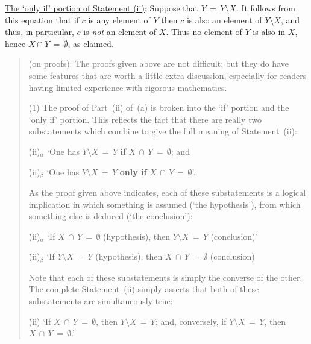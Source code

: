         \underline{The `only if' portion of Statement (ii)}: Suppose that $Y \,=\, Y{\setminus}X$.
    It follows from this equation that if $c$ is any element of $Y$ then $c$ is also an element of $Y{\setminus}X$, and thus, in particular, $c$ is {\em not} an element of $X$.
    Thus no element of $Y$ is also in $X$, hence $X{\cap}Y \,=\, {\emptyset}$, as claimed.

\V


\begin{quotation}
{\footnotesize \underline{\Note} (on proofs): The proofs given above are not difficult;
    but they do have some features that are worth a little extra discussion, especially for readers having limited experience with rigorous mathematics.

\V

        (1) The proof of Part~(ii) of~(a) is broken into the `if' portion and the `only if' portion.
	This reflects the fact that there are really two substatements which combine to give the full meaning of Statement~(ii):

    \h (ii)$_{{\alpha}}$ `One has $Y{\setminus}X \,=\, Y$ {\bf if} $X\,{\cap}\,Y \,=\, {\emptyset}$; and

    \h (ii)$_{{\beta}}$ `One has $Y{\setminus}X \,=\, Y$ {\bf only if} $X\,{\cap}\,Y \,=\, {\emptyset}$'.

\noindent As the proof given above indicates, each of these substatements is a logical implication in which something is assumed (`the hypothesis'),
    from which something else is deduced (`the conclusion'):
    
\VA

    \h (ii)$_{{\alpha}}$ `If $X\,{\cap}\,Y \,=\, {\emptyset}$ (hypothesis), then $Y{\setminus}X \,=\, Y$ (conclusion)'

    \h  (ii)$_{{\beta}}$ `If $Y{\setminus}X \,=\, Y$ (hypothesis), then $X\,{\cap}\,Y \,=\, {\emptyset}$ (conclusion)

\VA

\noindent Note that each of these substatements is simply the converse of the other.
    The complete Statement~(ii) simply asserts that both of these substatements are simultaneously true:

\VA

    \h    (ii) `If $X\,{\cap}\,Y \,=\, {\emptyset}$, then $Y{\setminus}X \,=\, Y$; and, conversely,
    if $Y{\setminus}X \,=\, Y$, then $X\,{\cap}\,Y \,=\, {\emptyset}$.'

}
\end{quotation}
